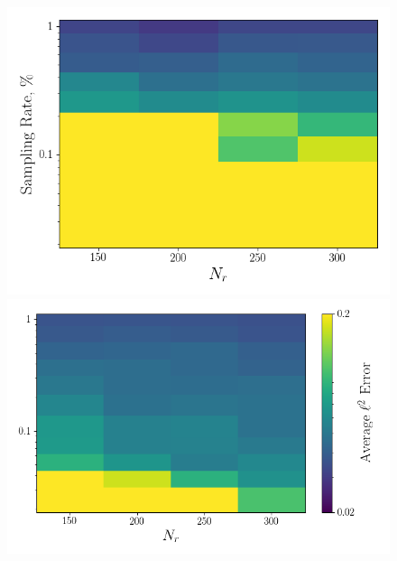 \begin{figure}
	\begin{minipage}{0.46\linewidth}
		\includegraphics[width=0.99\linewidth]{Chapters/CavityAndCVRC/Images/cvrc/deim/err_contour_random_dt1e-6.png}
	\end{minipage}
	\begin{minipage}{0.53\linewidth}
		\includegraphics[width=0.99\linewidth]{Chapters/CavityAndCVRC/Images/cvrc/deim/err_contour_eigenvec_dt1e-6.png}
	\end{minipage}


\end{figure}
